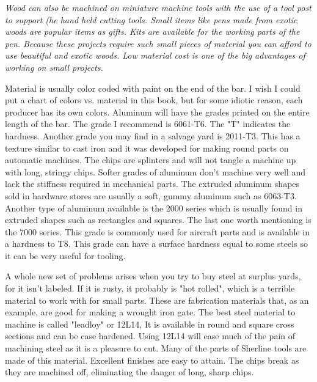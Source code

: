 \bigskip
\textit{Wood can also be machined on miniature machine tools with the use of a
tool post to support (he hand held cutting tools. Small items like pens made
from exotic woods are popular items as gifts. Kits are available for the working
parts of the pen. Because these projects require such small pieces of material
you can afford to use beautiful and exotic woods. Low material cost is one of
the big advantages of working on small projects.}
\bigskip


Material is usually color coded with paint on the end of the bar. I wish I could
put a chart of colors vs. material in this book, but for some idiotic reason,
each producer has its own colors. Aluminum will have the grades printed on the
entire length of the bar. The grade I recommend is 6061-T6. The "T" indicates
the hardness. Another grade you may find in a salvage yard is 2011-T3. This has
a texture similar to cast iron and it was developed for making round parts on
automatic machines. The chips are splinters and will not tangle a machine up
with long, stringy chips. Softer grades of aluminum don't machine very well and
lack the stiffness required in mechanical parts. The extruded aluminum shapes
sold in hardware stores are usually a soft, gummy aluminum such as 6063-T3.
Another type of aluminum available is the 2000 series which is usually found in
extruded shapes such as rectangles and squares. The last one worth mentioning is
the 7000 series. This grade is commonly used for aircraft parts and is available
in a hardness to T8. This grade can have a surface hardness equal to some steels
so it can be very useful for tooling.


A whole new set of problems arises when you try to buy steel at surplus yards,
for it isn't labeled. If it is rusty, it probably is "hot rolled", which is a
terrible material to work with for small parts. These are fabrication materials
that, as an example, are good for making a wrought iron gate. The best steel
material to machine is called "leadloy" or 12L14, It is available in round and
square cross sections and can be case hardened. Using 12L14 will ease much of
the pain of machining steel as it is a pleasure to cut. Many of the parts of
Sherline tools are made of this material. Excellent finishes are easy to attain.
The chips break as they are machined off, eliminating the danger of long, sharp
chips.

